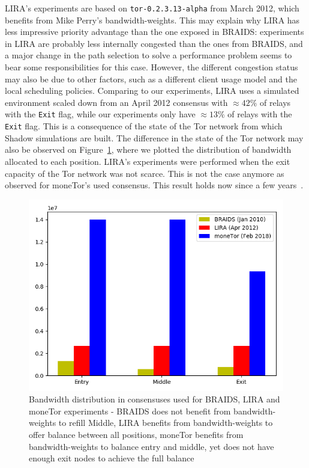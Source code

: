 LIRA's experiments are based on \texttt{tor-0.2.3.13-alpha} from March 2012, which benefits
from Mike Perry's bandwidth-weights. This may explain why LIRA has less impressive priority advantage than the one exposed in BRAIDS: experiments in LIRA are probably less internally congested than the ones from BRAIDS, and a major change in the path selection to solve a performance problem seems to bear some responsibilities for this case. However, the different congestion status may also be due to other factors, such as a different client usage model and the local scheduling policies. Comparing to our experiments, LIRA uses a simulated environment scaled down from an April 2012 consensus with $\approx 42\%$ of relays with the \texttt{Exit} flag, while our experiments only have $\approx 13\%$ of relays with the \texttt{Exit} flag. This is a consequence of the state of the Tor network from which Shadow simulations are built. The difference in the state of the Tor network may also be observed on Figure~\ref{fig:bw_comp}, where we plotted the distribution of bandwidth allocated to each position. LIRA's experiments were performed when the exit capacity of the Tor network was not scarce. This is not the case anymore as observed for moneTor's used consensus. This result holds now since a few years~\cite{waterfilling-pets2017}.


\begin{figure}
	\centering
  \includegraphics[scale=0.415]{images/bw_analysis_comp.png}
  \caption{Bandwidth distribution in consensuses used for BRAIDS, LIRA and moneTor experiments - BRAIDS does not benefit from bandwidth-weights to refill Middle, LIRA benefits from bandwidth-weights to offer balance between all positions, moneTor benefits from bandwidth-weights to balance entry and middle, yet does not have enough exit nodes to achieve the full balance} 
  \label{fig:bw_comp}
\end{figure}

